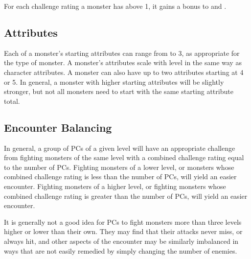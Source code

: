          For each challenge rating a monster has above 1, it gains a  bonus to  and .

    \subsection{Attributes}
        Each of a monster's starting attributes can range from  to 3, as appropriate for the type of monster.
        A monster's attributes scale with level in the same way as character attributes.
        A monster can also have up to two attributes starting at 4 or 5.
        In general, a monster with higher starting attributes will be slightly stronger, but not all monsters need to start with the same starting attribute total.

    \subsection{Encounter Balancing}\label{Encounter Balancing}
        In general, a group of PCs of a given level will have an appropriate challenge from fighting monsters of the same level with a combined challenge rating equal to the number of PCs.
        Fighting monsters of a lower level, or monsters whose combined challenge rating is less than the number of PCs, will yield an easier encounter.
        Fighting monsters of a higher level, or fighting monsters whose combined challenge rating is greater than the number of PCs, will yield an easier encounter.

        It is generally not a good idea for PCs to fight monsters more than three levels higher or lower than their own.
        They may find that their attacks never miss, or always hit, and other aspects of the encounter may be similarly imbalanced in ways that are not easily remedied by simply changing the number of enemies.


